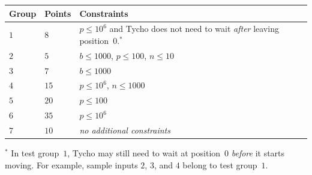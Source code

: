 \medskip
\begin{tabular}{lll}
Group & Points & Constraints \\\hline
  $1$ & $8$  & $p\leq 10^6$ and Tycho does not need to wait \emph{after} leaving position~$0$.$^*$ \\ %
  $2$ & $5$  & $b\leq 1000$, $p\leq 100$, $n\leq 10$ \\
  $3$ & $7$  & $b\leq 1000$ \\
  $4$ & $15$ & $p\leq 10^6$, $n\leq 1000$\\
  $5$ & $20$ & $p\leq 100$\\
  $6$ & $35$ & $p\leq 10^6$\\
  $7$ & $10$ & \emph{no additional constraints}
\end{tabular}

\medskip
\noindent $^*$ In test group~$1$, Tycho may still need to wait at position~$0$ \emph{before} it starts moving.
For example, sample inputs $2$, $3$, and $4$ belong to test group~$1$.
